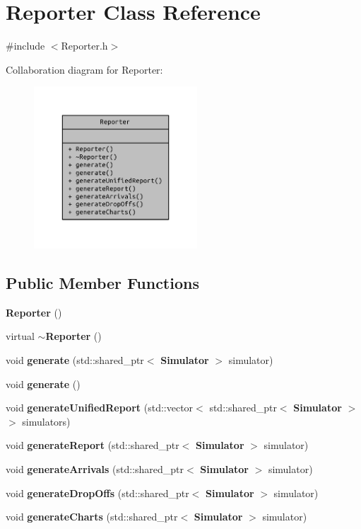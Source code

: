 \section{Reporter Class Reference}
\label{class_reporter}


{\ttfamily \#include $<$Reporter.\+h$>$}



Collaboration diagram for Reporter\+:\nopagebreak
\begin{figure}[H]
\begin{center}
\leavevmode
\includegraphics[width=173pt]{class_reporter__coll__graph}
\end{center}
\end{figure}
\subsection*{Public Member Functions}
\begin{DoxyCompactItemize}
\item 
{\bf Reporter} ()
\item 
virtual {\bf $\sim$\+Reporter} ()
\item 
void {\bf generate} (std\+::shared\+\_\+ptr$<$ {\bf Simulator} $>$ simulator)
\item 
void {\bf generate} ()
\item 
void {\bf generate\+Unified\+Report} (std\+::vector$<$ std\+::shared\+\_\+ptr$<$ {\bf Simulator} $>$$>$ simulators)
\item 
void {\bf generate\+Report} (std\+::shared\+\_\+ptr$<$ {\bf Simulator} $>$ simulator)
\item 
void {\bf generate\+Arrivals} (std\+::shared\+\_\+ptr$<$ {\bf Simulator} $>$ simulator)
\item 
void {\bf generate\+Drop\+Offs} (std\+::shared\+\_\+ptr$<$ {\bf Simulator} $>$ simulator)
\item 
void {\bf generate\+Charts} (std\+::shared\+\_\+ptr$<$ {\bf Simulator} $>$ simulator)
\end{DoxyCompactItemize}


